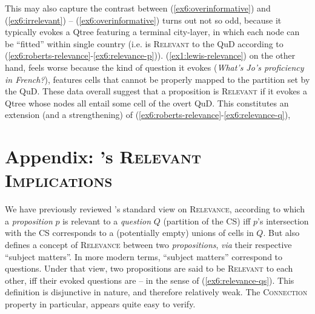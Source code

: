 This may also capture the contrast between (\ref{ex6:overinformative}) and (\ref{ex6:irrelevant}) -- (\ref{ex6:overinformative}) turns out not so odd, because it typically evokes a Qtree featuring a terminal city-layer, in which each node can be ``fitted'' within single country (i.e. is \textsc{Relevant} to the QuD according to (\ref{ex6:roberts-relevance}-\ref{ex6:relevance-p})). (\ref{ex1:lewis-relevance}) on the other hand, feels worse because the kind of question it evokes (\textit{What's Jo's proficiency in French?}), features cells that cannot be properly mapped to the partition set by the QuD. These data overall suggest that a proposition is \textsc{Relevant} if it evokes a Qtree whose nodes all entail some cell of the overt QuD. This constitutes an extension (and a strengthening) of (\ref{ex6:roberts-relevance}-\ref{ex6:relevance-q}),

\fi
\section{Appendix: \citeauthor{Lewis1988}'s \textsc{Relevant Implications}}\label{sec6:lewis}

We have previously reviewed \citet{Lewis1988}'s standard view on  \textsc{Relevance}, according to which a \textit{proposition} $p$ is relevant to a \textit{question} $Q$ (partition of the CS) iff $p$'s intersection with the CS corresponds to a (potentially empty) unions of cells in $Q$. But \citet{Lewis1988} also defines a concept of \textsc{Relevance} between two \textit{propositions}, \textit{via} their respective ``subject matters''. In more modern terms, ``subject matters'' correspond to questions. Under that view, two propositions are said to be \textsc{Relevant} to each other, iff their evoked questions are -- in the sense of (\ref{ex6:relevance-qs}). This definition is disjunctive in nature, and therefore relatively weak. The \textsc{Connection} property in particular, appears quite easy to verify.

\begin{exe}
	\label{ex6:relevance-qs}
\end{exe}

